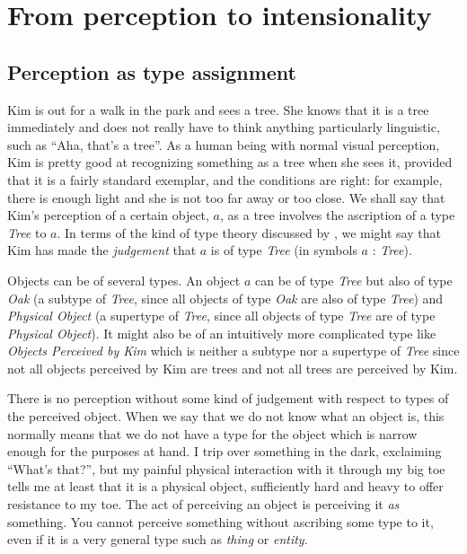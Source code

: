 \chapter{From perception to intensionality}
\label{ch:percint}
\pagestyle{headings}


\section{Perception as type assignment}
\label{sec:perc}

Kim is out for a walk in the park and sees a tree.  She knows that it is a tree
immediately and does not really have to think anything particularly
linguistic, such as ``Aha, that's a tree''.  As a human being with
normal visual perception, Kim is pretty good at recognizing something
as a tree when she sees it, provided that it is a fairly standard
exemplar, and the conditions are right:  for example, there is enough
light and she is
not too far away or too close.  We shall say that Kim's perception of
a certain object, $a$, as a tree involves the ascription of a type
\textit{Tree} to $a$.  In terms of the kind of type theory discussed by
\cite{Martin-Loef1984,NordstromPeterssonSmith1990}, we might say that
Kim has made the \textit{judgement} that $a$ is of type \textit{Tree}
(in symbols $a$ : \textit{Tree}).


Objects can be of several types.  An object $a$ can be of type
\textit{Tree} but also of type \textit{Oak} (a subtype of
\textit{Tree}, since all objects of type \textit{Oak} are also of type
\textit{Tree}) and \textit{Physical Object} (a supertype of
\textit{Tree}, since all objects of type \textit{Tree} are of type
\textit{Physical Object}).  It might also be of an intuitively more complicated type like
\textit{Objects Perceived by Kim} which is neither a subtype nor a
supertype of \textit{Tree} since not all objects perceived by Kim are
trees and not all trees are perceived by Kim.

There is no perception without some kind of judgement
with respect to types of the perceived object.  When we say that we do
not know what an object is, this normally means that we do not have a
type for the object which is narrow enough for the purposes at hand.
I trip over something in the dark, exclaiming ``What's that?'', but my
painful physical interaction with it through my big toe tells me at
least that
it is a physical object, sufficiently hard and heavy to offer
resistance to my toe.  The act of perceiving an object is perceiving
it \textit{as} something.  You cannot perceive something without
ascribing some type to it, even if it is a very general type such as
\textit{thing} or \textit{entity}.


